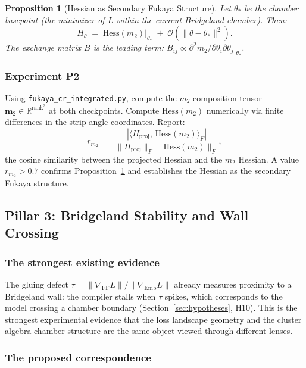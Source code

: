 \documentclass[11pt]{amsart}
\newtheorem{proposition}[theorem]{Proposition}
\begin{document}
\begin{proposition}[Hessian as Secondary Fukaya Structure]
\label{prop:hess_m2}
Let $\theta_*$ be the chamber basepoint (the minimizer of $L$
within the current Bridgeland chamber).
Then:
\[
  H_\theta \;=\; \mathrm{Hess}(m_2)\big|_{\theta_*}
             \;+\; \mathcal{O}(\|\theta - \theta_*\|^2).
\]
The exchange matrix $B$ is the leading term:
$B_{ij} \propto \partial^2 m_2 / \partial\theta_i \partial\theta_j
\big|_{\theta_*}$.
\end{proposition}

\subsubsection*{Experiment P2}

Using \texttt{fukaya\_cr\_integrated.py}, compute the $m_2$
composition tensor $\mathbf{m}_2 \in \mathbb{R}^{\mathrm{rank}^3}$
at both checkpoints.
Compute $\mathrm{Hess}(m_2)$ numerically via finite differences
in the strip-angle coordinates.
Report:
\[
  r_{m_2} \;=\;
  \frac{|\langle H_\mathrm{proj},\, \mathrm{Hess}(m_2)\rangle_F|}
       {\|H_\mathrm{proj}\|_F \|\mathrm{Hess}(m_2)\|_F},
\]
the cosine similarity between the projected Hessian and the
$m_2$ Hessian.
A value $r_{m_2} > 0.7$ confirms Proposition~\ref{prop:hess_m2}
and establishes the Hessian as the secondary Fukaya structure.

\subsection{Pillar 3: Bridgeland Stability and Wall Crossing}
\label{sec:pillar3}

\subsubsection*{The strongest existing evidence}

The gluing defect $\tau = \|\nabla_\mathrm{FF} L\| /
\|\nabla_\mathrm{Emb} L\|$ already measures proximity to
a Bridgeland wall: the compiler stalls when $\tau$ spikes,
which corresponds to the model crossing a chamber boundary
(Section~\ref{sec:hypotheses}, H10).
This is the strongest experimental evidence that the loss landscape
geometry and the cluster algebra chamber structure are
the same object viewed through different lenses.

\subsubsection*{The proposed correspondence}
\end{document}
